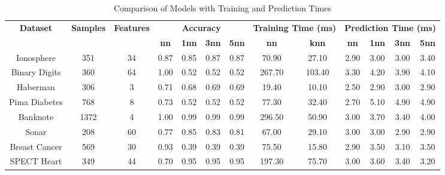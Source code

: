 \begin{table}[H]
\centering
\begin{tabular}{|c|c|c|c|c|c|c|c|c|c|c|c|c|}
\hline
\multirow{2}{*}{\textbf{Dataset}} & \multirow{2}{*}{\textbf{Samples}} & \multirow{2}{*}{\textbf{Features}} & \multicolumn{4}{c|}{\textbf{Accuracy}} & \multicolumn{2}{c|}{\textbf{Training Time (ms)}} & \multicolumn{4}{c|}{\textbf{Prediction Time (ms)}} \\ \cline{4-7} \cline{8-9} \cline{10-13}
 & & & \textbf{nn} & \textbf{1nn} & \textbf{3nn} & \textbf{5nn} & \textbf{nn} & \textbf{knn} & \textbf{nn} & \textbf{1nn} & \textbf{3nn} & \textbf{5nn} \\ \hline
Ionosphere & 351 & 34 & 0.87 & 0.85 & 0.87 & 0.87 & 70.90 & 27.10 & 2.90 & 3.00 & 3.00 & 3.40 \\ \hline
Binary Digits & 360 & 64 & 1.00 & 0.52 & 0.52 & 0.52 & 267.70 & 103.40 & 3.30 & 4.20 & 3.90 & 4.10 \\ \hline
Haberman & 306 & 3 & 0.71 & 0.68 & 0.69 & 0.69 & 19.40 & 10.10 & 2.50 & 2.90 & 3.00 & 2.90 \\ \hline
Pima Diabetes & 768 & 8 & 0.73 & 0.52 & 0.52 & 0.52 & 77.30 & 32.40 & 2.70 & 5.10 & 4.90 & 4.90 \\ \hline
Banknote & 1372 & 4 & 1.00 & 0.99 & 0.99 & 0.99 & 296.50 & 50.90 & 3.00 & 3.70 & 3.40 & 4.00 \\ \hline
Sonar & 208 & 60 & 0.77 & 0.85 & 0.83 & 0.81 & 67.00 & 29.10 & 3.00 & 3.00 & 2.90 & 2.90 \\ \hline
Breast Cancer & 569 & 30 & 0.93 & 0.39 & 0.39 & 0.39 & 75.50 & 15.80 & 2.90 & 3.50 & 3.10 & 3.50 \\ \hline
SPECT Heart & 349 & 44 & 0.70 & 0.95 & 0.95 & 0.95 & 197.30 & 75.70 & 3.00 & 3.60 & 3.40 & 3.20 \\ \hline
\end{tabular}
\caption{Comparison of Models with Training and Prediction Times}
\label{tab:comparison_results}
\end{table}